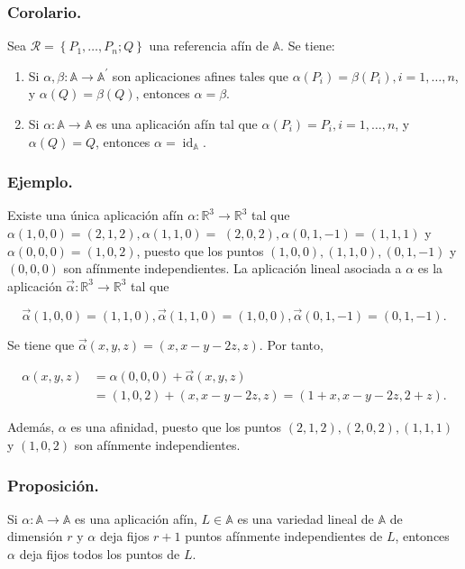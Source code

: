 \documentclass[12pt, a4paper, ones, notitlepage, openany,titlepage]{article}
\begin{document}
\subsubsection{Corolario.} Sea $\mathcal{R}=\left\{P_{1}, \ldots, P_{n} ; Q\right\}$ una referencia afín de $\mathbb{A}$. Se tiene:

\begin{enumerate}

\item Si $\alpha, \beta: \mathbb{A} \rightarrow \mathbb{A}^{\prime}$ son aplicaciones afines tales que $\alpha\left(P_{i}\right)=\beta\left(P_{i}\right), i=1, \ldots, n$, y $\alpha(Q)=\beta(Q)$, entonces $\alpha=\beta$.

\item Si $\alpha: \mathbb{A} \rightarrow \mathbb{A}$ es una aplicación afín tal que $\alpha\left(P_{i}\right)=P_{i}, i=1, \ldots, n$, y $\alpha(Q)=Q$, entonces $\alpha=\operatorname{id}_{\mathbb{A}}$.

\end{enumerate}

\subsubsection{Ejemplo.} Existe una única aplicación afín $\alpha: \mathbb{R}^{3} \rightarrow \mathbb{R}^{3}$ tal que $\alpha(1,0,0)=(2,1,2), \alpha(1,1,0)=$ $(2,0,2), \alpha(0,1,-1)=(1,1,1)$ y $\alpha(0,0,0)=(1,0,2)$, puesto que los puntos $(1,0,0),(1,1,0),(0,1,-1)$ y $(0,0,0)$ son afínmente independientes. La aplicación lineal asociada a $\alpha$ es la aplicación $\vec{\alpha}: \mathbb{R}^{3} \rightarrow \mathbb{R}^{3}$ tal que

$$
\vec{\alpha}(1,0,0)=(1,1,0), \vec{\alpha}(1,1,0)=(1,0,0), \vec{\alpha}(0,1,-1)=(0,1,-1) .
$$

Se tiene que $\vec{\alpha}(x, y, z)=(x, x-y-2 z, z)$. Por tanto,

$$
\begin{aligned}
\alpha(x, y, z) & =\alpha(0,0,0)+\vec{\alpha}(x, y, z) \\
& =(1,0,2)+(x, x-y-2 z, z)=(1+x, x-y-2 z, 2+z) .
\end{aligned}
$$

Además, $\alpha$ es una afinidad, puesto que los puntos $(2,1,2),(2,0,2),(1,1,1)$ y $(1,0,2)$ son afínmente independientes.

\subsubsection{Proposición.} Si $\alpha: \mathbb{A} \rightarrow \mathbb{A}$ es una aplicación afín, $L\in\mathbb{A}$ es una variedad lineal de $\mathbb{A}$ de dimensión $r$ y $\alpha$ deja fijos $r+1$ puntos afínmente independientes de $L$, entonces $\alpha$ deja fijos todos los puntos de $L$.\\
\end{document}
